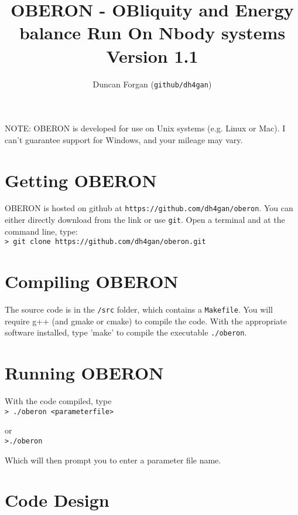 \documentclass[usenatbib,11pt]{article}
\begin{document}
\title{OBERON - OBliquity and Energy balance Run On Nbody systems\\Version 1.1}
\author{Duncan Forgan (\texttt{github/dh4gan})}
\maketitle

\noindent NOTE: OBERON is developed for use on Unix systems (e.g. Linux or Mac).  I can't guarantee support for Windows, and your mileage may vary.

\tableofcontents
\newpage



\section{Getting OBERON}

\noindent OBERON is hosted on github at \texttt{https://github.com/dh4gan/oberon}.  You can either directly download from the link or use \texttt{git}.  Open a terminal and at the command line, type:\\

\texttt{> git clone https://github.com/dh4gan/oberon.git}

\section{Compiling OBERON}

\noindent   The source code is in the \texttt{/src} folder, which contains a \texttt{Makefile}.  You will require g++ (and gmake or cmake) to compile the code. With the appropriate software installed, type 'make' to compile the executable \texttt{./oberon}.


\section{Running OBERON}

\noindent With the code compiled, type\\

\texttt{> ./oberon <parameterfile>}

\noindent or\\

\texttt{>./oberon}

Which will then prompt you to enter a parameter file name.

\section{Code Design}
\end{document}

